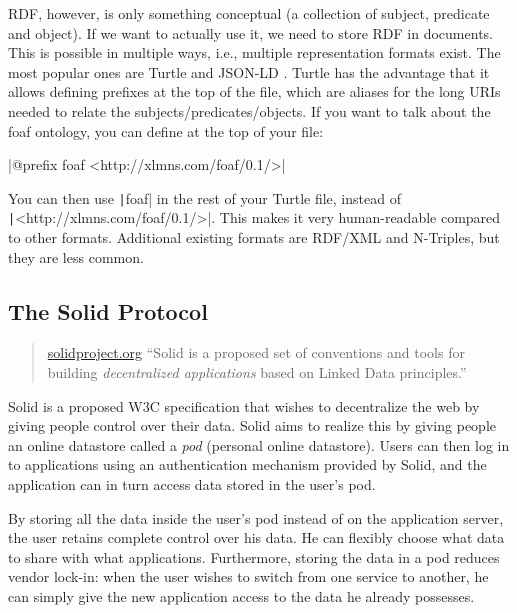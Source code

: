 \gls{RDF}, however, is only something conceptual (a collection of subject, predicate and object). If we want to actually use it, we need to store \gls{RDF} in documents. This is possible in multiple ways, i.e., multiple representation formats exist. The most popular ones are Turtle \citep{turtle} and JSON-LD \citep{jsonld}. Turtle has the advantage that it allows defining prefixes at the top of the file, which are aliases for the long URIs needed to relate the subjects/predicates/objects. If you want to talk about the foaf ontology, you can define at the top of your file:

|@prefix foaf <http://xlmns.com/foaf/0.1/>|

\noindent You can then use \texttt|foaf| in the rest of your Turtle file, instead of\\ \texttt|<http://xlmns.com/foaf/0.1/>|. This makes it very human-readable compared to other formats. Additional existing formats are \gls{RDF}/XML and N-Triples, but they are less common.

\subsection{The Solid Protocol}
\label{sec:solid-protocol}
\begin{quote}{\href{https://solidproject.org}{solidproject.org}}
    ``Solid is a proposed set of conventions and tools for building \textit{decentralized applications} based on Linked Data principles.''
\end{quote}

\noindent Solid \citep{solid} is a proposed W3C specification that wishes to decentralize the web by giving people control over their data. Solid aims to realize this by giving people an online datastore called a \textit{pod} (personal online datastore). Users can then log in to applications using an authentication mechanism provided by Solid, and the application can in turn access data stored in the user's pod.

By storing all the data inside the user's pod instead of on the application server, the user retains complete control over his data. He can flexibly choose what data to share with what applications. Furthermore, storing the data in a pod reduces vendor lock-in: when the user wishes to switch from one service to another, he can simply give the new application access to the data he already possesses. 

